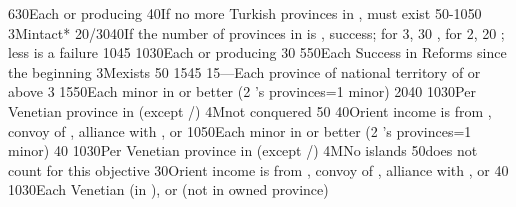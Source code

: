 {6}{30}{Each \COL or \TP producing \POSPICE}%
%
%
%
%
{}{40}{If no more Turkish provinces in \payshongrie, \paystransylvanie must
  exist}%
%
%
%
{50-10}{50}{\EU@objPresidiosTUR}%
%
\EUobjective3M{\payscrimee intact*}{}%
{20/30}{40}{If the number of provinces in \payscrimee is , success; for
  3, 30 \VPs, for 2, 20 \VPs; less is a failure}%
%
%
{10}{45}{}%
%
%
{10}{30}{Each \COL or \TP producing \POSPICE}%
%
%
%
{}{30}{}%
%
%
{5}{50}{Each Success in Reforms since the beginning}%
%
\EUobjective3M{\payscrimee exists}{}%
{}{50}{}%
%
%
{15}{45}{}%
%
%
{15}{---}{Each province of national territory of  or
   above 3}%
%
 
%
%
{15}{50}{Each minor in \EG or better (2 's provinces=1 minor)}%
%
%
{20}{40}{}%
%
%
{10}{30}{Per Venetian province in \regionBalkans (except
  \provinceHellas/\provinceMoreas)}%
%
\EUobjective4M{\paysmamelouks not conquered}{}%
{}{50}{}%
%
%
{}{40}{Orient income is from , convoy of \villeIzmir,
  alliance with \paysaden, \paysoman or \paysgujarat}%
%
%
%
{10}{50}{Each minor in \EG or better (2 's provinces=1 minor)}%
%
%
{}{40}{}%
%
%
{10}{30}{Per Venetian province in \regionBalkans (except
  \provinceHellas/\provinceMoreas)}%
%
\EUobjective4M{No \TUR islands}{}%
{}{50}{\provinceRhodos does not count for this objective}%
%
%
{}{30}{Orient income is from , convoy of \villeIzmir,
  alliance with \paysaden, \paysoman or \paysgujarat}%
%
%
%
{}{40}{}%
%
%
{10}{30}{Each Venetian \Presidio (in ), or \regionBalkans
  (not in owned province)}%
